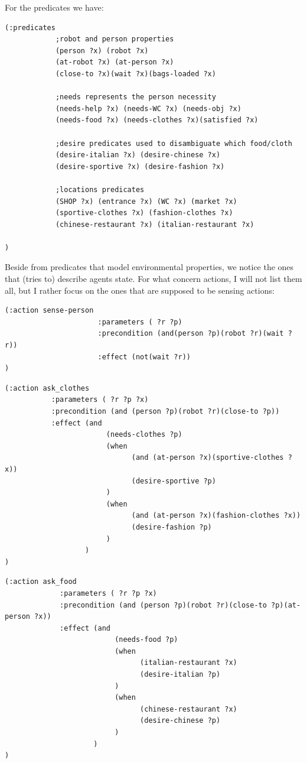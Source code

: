 \documentclass[pdftex,12pt,a4paper]{report}
\begin{document}
\noindent For the predicates we have:
\begin{verbatim}
(:predicates
            ;robot and person properties
            (person ?x) (robot ?x)
            (at-robot ?x) (at-person ?x)
            (close-to ?x)(wait ?x)(bags-loaded ?x)

            ;needs represents the person necessity
            (needs-help ?x) (needs-WC ?x) (needs-obj ?x)
            (needs-food ?x) (needs-clothes ?x)(satisfied ?x)

            ;desire predicates used to disambiguate which food/cloth
            (desire-italian ?x) (desire-chinese ?x)
            (desire-sportive ?x) (desire-fashion ?x)

            ;locations predicates
            (SHOP ?x) (entrance ?x) (WC ?x) (market ?x)
            (sportive-clothes ?x) (fashion-clothes ?x)
            (chinese-restaurant ?x) (italian-restaurant ?x)

)
\end{verbatim}
Beside from predicates that model environmental properties, we notice the ones that (tries to) describe agents state. 
\noindent For what concern actions, I will not list them all, but I rather focus on the ones that are supposed to be sensing actions:
\begin{verbatim}
(:action sense-person
                      :parameters ( ?r ?p)
                      :precondition (and(person ?p)(robot ?r)(wait ?r))
                      :effect (not(wait ?r))
)
\end{verbatim}

\begin{verbatim}
(:action ask_clothes
           :parameters ( ?r ?p ?x)
           :precondition (and (person ?p)(robot ?r)(close-to ?p))
           :effect (and
                        (needs-clothes ?p)
                        (when
                              (and (at-person ?x)(sportive-clothes ?x))
                              (desire-sportive ?p)
                        )
                        (when
                              (and (at-person ?x)(fashion-clothes ?x))
                              (desire-fashion ?p)
                        )
                   )
)
\end{verbatim}

\begin{verbatim}
(:action ask_food
             :parameters ( ?r ?p ?x)
             :precondition (and (person ?p)(robot ?r)(close-to ?p)(at-person ?x))
             :effect (and
                          (needs-food ?p)
                          (when
                                (italian-restaurant ?x)
                                (desire-italian ?p)
                          )
                          (when
                                (chinese-restaurant ?x)
                                (desire-chinese ?p)
                          )
                     )
)
\end{verbatim}
\end{document}
